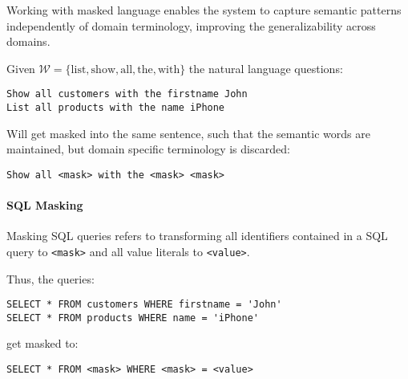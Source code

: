 Working with masked language enables the system to capture semantic patterns
independently of domain terminology, improving the generalizability across
domains.

Given $\mathcal{W} = \{\text{list}, \text{show}, \text{all}, \text{the},
\text{with}\}$ the natural language
questions:

\begin{verbatim}
Show all customers with the firstname John
List all products with the name iPhone
\end{verbatim}

Will get masked into the same sentence, such that the semantic words are
maintained, but domain specific terminology is discarded:

\begin{verbatim}
Show all <mask> with the <mask> <mask>
\end{verbatim}

\paragraph{SQL Masking}\label{design:sql-masking}

Masking SQL queries refers to transforming all identifiers contained in 
a SQL query to \texttt{<mask>} and all value literals to \texttt{<value>}.

Thus, the queries:

\begin{verbatim}
SELECT * FROM customers WHERE firstname = 'John'
SELECT * FROM products WHERE name = 'iPhone'
\end{verbatim}

get masked to:

\begin{verbatim}
SELECT * FROM <mask> WHERE <mask> = <value>
\end{verbatim}



